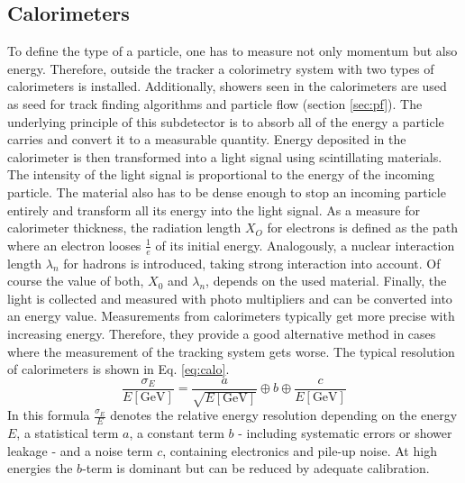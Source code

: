 \subsection{Calorimeters}
	To define the type of a particle, one has to measure not only momentum but also energy. Therefore, outside the tracker a colorimetry system with two types of calorimeters is installed. Additionally, showers seen in the calorimeters are used as seed for track finding algorithms and particle flow (section \ref{sec:pf}). The underlying principle of this subdetector is to absorb all of the energy a particle carries and convert it to a measurable quantity. Energy deposited in the calorimeter is then transformed into a light signal using scintillating materials. The intensity of the light signal is proportional to the energy of the incoming particle. The material also has to be dense enough to stop an incoming particle entirely and transform all its energy into the light signal. As a measure for calorimeter thickness, the radiation length $X_O$ for electrons is defined as the path where an electron looses $\frac{1}{e}$ of its initial energy. Analogously, a nuclear interaction length $\lambda_n$ for hadrons is introduced, taking strong interaction into account. Of course the value of both, $X_0$ and $\lambda_n$, depends on the used material. Finally, the light is collected and measured with photo multipliers and can be converted into an energy value. Measurements from calorimeters typically get more precise with increasing energy. Therefore, they provide a good alternative method in cases where the measurement of the tracking system gets worse. The typical resolution of calorimeters is shown in Eq. \ref{eq:calo}.
	\begin{equation}
	\frac{\sigma_E}{E\left[\text{GeV}\right]} = \frac{a}{\sqrt{E\left[\text{GeV}\right]}} \oplus b \oplus \frac{c}{E\left[\text{GeV}\right]}
	\label{eq:calo}
	\end{equation}
	In this formula $\frac{\sigma_E}{E}$ denotes the relative energy resolution depending on the energy $E$, a statistical term $a$, a constant term $b$ - including systematic errors or shower leakage - and a noise term $c$, containing electronics and pile-up noise. At high energies the $b$-term is dominant but can be reduced by adequate calibration. 
